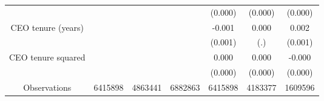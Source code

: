 \begin{table}[htbp]
\begin{tabular}{*{7}{c}}
                    &                     &                     &                     &     (0.000)         &     (0.000)         &     (0.000)         \\
[1em]
CEO tenure (years)  &                     &                     &                     &      -0.001\sym{**} &       0.000         &       0.002         \\
                    &                     &                     &                     &     (0.001)         &         (.)         &     (0.001)         \\
[1em]
CEO tenure squared  &                     &                     &                     &       0.000         &       0.000         &      -0.000\sym{***}\\
                    &                     &                     &                     &     (0.000)         &     (0.000)         &     (0.000)         \\
\midrule
Observations        &     6415898         &     4863441         &     6882863         &     6415898         &     4183377         &     1609596         \\
\bottomrule
\end{tabular}
\end{table}
